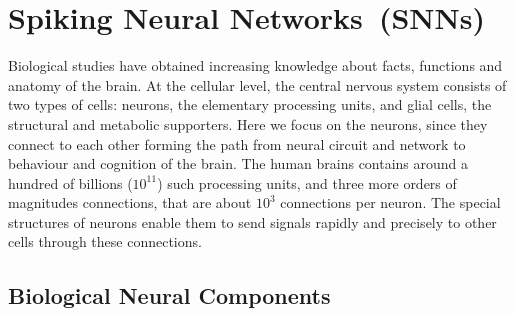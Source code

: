 \chapter{Spiking Neural Networks~(SNNs)}
\label{cha:bkg}
Biological studies have obtained increasing knowledge about facts, functions and anatomy of the brain.
At the cellular level, the central nervous system consists of two types of cells: neurons, the elementary processing units, and glial cells, the structural and metabolic supporters. 
Here we focus on the neurons, since they connect to each other forming the path from neural circuit and network to behaviour and cognition of the brain.
The human brains contains around a hundred of billions ($10^11$) such processing units, and three more orders of magnitudes connections, that are about $10^3$ connections per neuron.
The special structures of neurons enable them to send signals rapidly and precisely to other cells through these connections.


\section{Biological Neural Components}
